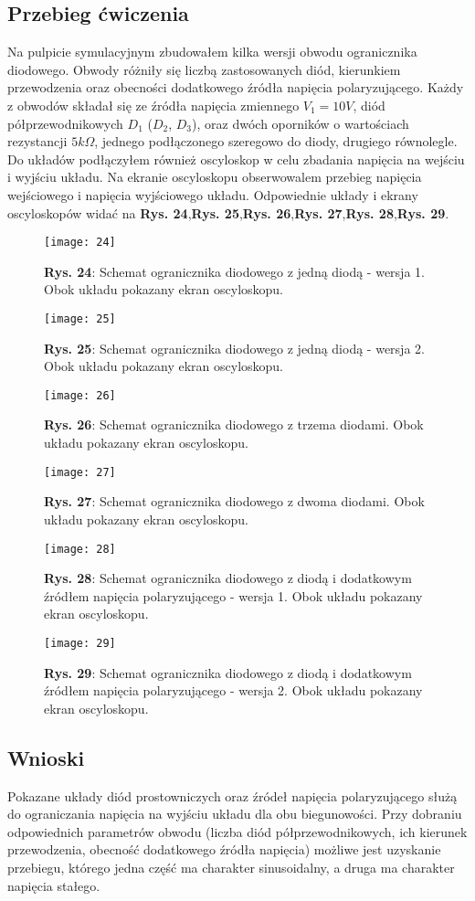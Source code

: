\documentclass[11pt]{article}
\begin{document}
\subsection{Przebieg ćwiczenia}
Na pulpicie symulacyjnym zbudowałem kilka wersji obwodu ogranicznika diodowego. Obwody różniły się liczbą zastosowanych diód, kierunkiem przewodzenia oraz obecności dodatkowego źródła napięcia polaryzującego. Każdy z obwodów składał się ze źródła napięcia zmiennego $V_1 = 10V$, diód półprzewodnikowych
$D_1$ ($D_2$, $D_3$), oraz dwóch oporników o wartościach rezystancji $5k\Omega$, jednego podłączonego szeregowo do diody, drugiego równolegle. Do układów podłączyłem również oscyloskop w celu zbadania napięcia na wejściu i wyjściu układu. Na ekranie oscyloskopu obserwowalem przebieg napięcia wejściowego i 
napięcia wyjściowego układu. Odpowiednie układy i ekrany oscyloskopów widać na \textbf{Rys. 24},\textbf{Rys. 25},\textbf{Rys. 26},\textbf{Rys. 27},\textbf{Rys. 28},\textbf{Rys. 29}.
\begin{figure}[H]
\centering
\texttt{[image: 24]}
\caption*{\textbf{Rys. 24}: Schemat ogranicznika diodowego z jedną diodą - wersja 1. Obok układu pokazany ekran oscyloskopu. }
\end{figure}
\begin{figure}[H]
\centering
\texttt{[image: 25]}
\caption*{\textbf{Rys. 25}: Schemat ogranicznika diodowego z jedną diodą - wersja 2. Obok układu pokazany ekran oscyloskopu. }
\end{figure}
\begin{figure}[H]
\centering
\texttt{[image: 26]}
\caption*{\textbf{Rys. 26}: Schemat ogranicznika diodowego z trzema diodami. Obok układu pokazany ekran oscyloskopu. }
\end{figure}
\begin{figure}[H]
\centering
\texttt{[image: 27]}
\caption*{\textbf{Rys. 27}: Schemat ogranicznika diodowego z dwoma diodami. Obok układu pokazany ekran oscyloskopu. }
\end{figure}
\begin{figure}[H]
\centering
\texttt{[image: 28]}
\caption*{\textbf{Rys. 28}: Schemat ogranicznika diodowego z diodą i dodatkowym źródłem napięcia polaryzującego - wersja 1. Obok układu pokazany ekran oscyloskopu. }
\end{figure}
\begin{figure}[H]
\centering
\texttt{[image: 29]}
\caption*{\textbf{Rys. 29}: Schemat ogranicznika diodowego z diodą i dodatkowym źródłem napięcia polaryzującego - wersja 2. Obok układu pokazany ekran oscyloskopu. }
\end{figure}
\subsection{Wnioski}
Pokazane układy diód prostowniczych oraz źródeł napięcia polaryzującego służą do ograniczania napięcia na wyjściu układu dla obu biegunowości. Przy dobraniu odpowiednich parametrów obwodu (liczba diód półprzewodnikowych, ich kierunek przewodzenia, obecność dodatkowego źródła napięcia) możliwe jest
uzyskanie przebiegu, którego jedna część ma charakter sinusoidalny, a druga ma charakter napięcia stałego.
\end{document}
